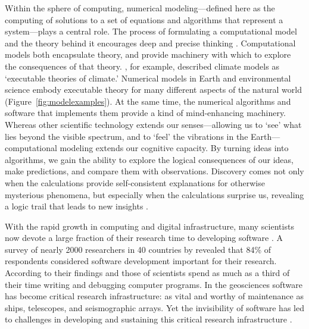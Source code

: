 \documentclass{article} %
\begin{document}
Within the sphere of computing, numerical modeling---defined here as the computing of solutions to a set of equations and algorithms that represent a system---plays a central role. The process of formulating a computational model and the theory behind it encourages deep and precise thinking \citep[e.g.,][]{guest2020computational}. Computational models both encapsulate theory, and provide machinery with which to explore the consequences of that theory. \citet{pipitone2012assessing}, for example, described climate models as `executable theories of climate.' Numerical models in Earth and environmental science embody executable theory for many different aspects of the natural world (Figure~\ref{fig:modelexamples}). At the same time, the numerical algorithms and software that implements them provide a kind of mind-enhancing machinery. Whereas other scientific technology extends our senses---allowing us to `see' what lies beyond the visible spectrum, and to `feel' the vibrations in the Earth---computational modeling extends our cognitive capacity. By turning ideas into algorithms, we gain the ability to explore the logical consequences of our ideas, make predictions, and compare them with observations. Discovery comes not only when the calculations provide self-consistent explanations for otherwise mysterious phenomena, but especially when the calculations surprise us, revealing a logic trail that leads to new insights \citep{bras2003six}.


With the rapid growth in computing and digital infrastructure, many scientists now devote a large fraction of their research time to developing software \citep{hannay2009scientists,prabhu2011survey,wilson2014best,singh2016unsung,pinto2018scientists}. A survey of nearly 2000 researchers in 40 countries by \citet{hannay2009scientists} revealed that 84\% of respondents considered software development important for their research. According to their findings and those of \citet{prabhu2011survey} scientists spend as much as a third of their time writing and debugging computer programs. In the geosciences  software has become critical research infrastructure: as vital and worthy of maintenance as ships, telescopes, and seismographic arrays. Yet the invisibility of software  has led to challenges in developing and sustaining this critical research infrastructure \citep{eghbal2016roads}.
\end{document}
